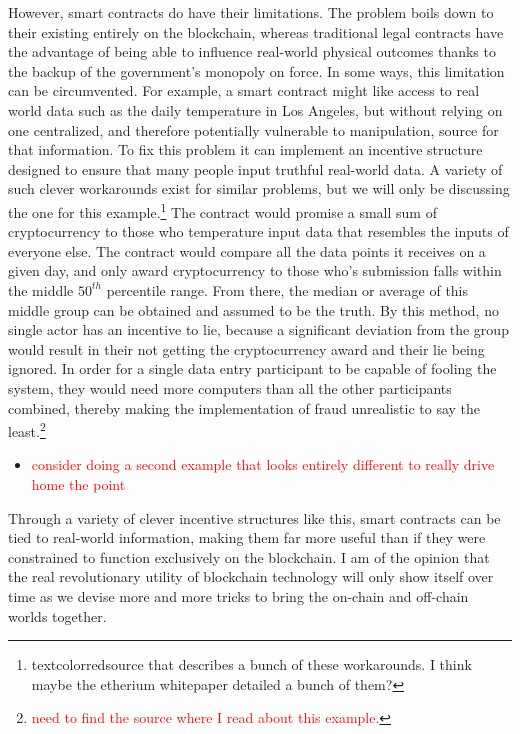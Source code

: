 \documentclass{article}[10pt]
\begin{document}
However, smart contracts do have their limitations.
The problem boils down to their existing entirely on the blockchain, whereas traditional legal contracts have the advantage of being able to influence real-world physical outcomes thanks to the backup of the government's monopoly on force.
In some ways, this limitation can be circumvented.
For example, a smart contract might like access to real world data such as the daily temperature in Los Angeles, but without relying on one centralized, and therefore potentially vulnerable to manipulation, source for that information.
To fix this problem it can implement an incentive structure designed to ensure that many people input truthful real-world data.
A variety of such clever workarounds exist for similar problems, but we will only be discussing the one for this example.\footnote{
    textcolor{red}{source that describes a bunch of these workarounds.
    I think maybe the etherium whitepaper detailed a bunch of them?}}
The contract would promise a small sum of cryptocurrency to those who temperature input data that resembles the inputs of everyone else.
The contract would compare all the data points it receives on a given day, and only award cryptocurrency to those who's submission falls within the middle $50^{th}$ percentile range. 
From there, the median or average of this middle group can be obtained and assumed to be the truth.
By this method, no single actor has an incentive to lie, because a significant deviation from the group would result in their not getting the cryptocurrency award and their lie being ignored.
In order for a single data entry participant to be capable of fooling the system, they would need more computers than all the other participants combined, thereby making the implementation of fraud unrealistic to say the least.\footnote{
    \textcolor{red}{need to find the source where I read about this example.}}\par 
    
\begin{itemize}
    \item \textcolor{red}{consider doing a second example that looks entirely different to really drive home the point}
\end{itemize}

Through a variety of clever incentive structures like this, smart contracts can be tied to real-world information, making them far more useful than if they were constrained to function exclusively on the blockchain.
I am of the opinion that the real revolutionary utility of blockchain technology will only show itself over time as we devise more and more tricks to bring the on-chain and off-chain worlds together. 
\end{document}
